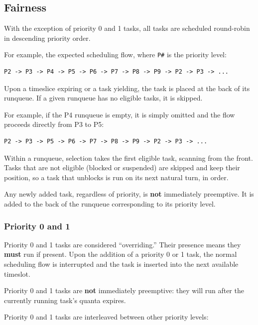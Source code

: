 \documentclass[11pt]{article}
\begin{document}
\subsection{Fairness}

With the exception of priority 0 and 1 tasks, all tasks are scheduled round-robin in descending priority order.

For example, the expected scheduling flow, where \texttt{P\#} is the priority level:

\begin{Verbatim}[fontsize=\small]
	P2 -> P3 -> P4 -> P5 -> P6 -> P7 -> P8 -> P9 -> P2 -> P3 -> ...
\end{Verbatim}

Upon a timeslice expiring or a task yielding, the task is placed at the back of its runqueue. If a given runqueue has no eligible tasks, it is skipped.

For example, if the P4 runqueue is empty, it is simply omitted and the flow proceeds directly from P3 to P5:

\begin{Verbatim}[fontsize=\small]
	P2 -> P3 -> P5 -> P6 -> P7 -> P8 -> P9 -> P2 -> P3 -> ...
\end{Verbatim}

Within a runqueue, selection takes the first eligible task, scanning from the front.
Tasks that are not eligible (blocked or suspended) are skipped and keep their position, so a task that unblocks is run on its next natural turn, in order.

Any newly added task, regardless of priority, is \textbf{not} immediately preemptive. It is added to the back of the runqueue corresponding to its priority level.

\subsubsection{Priority 0 and 1}

Priority 0 and 1 tasks are considered ``overriding.'' Their presence means they \textbf{must} run if present.
Upon the addition of a priority 0 or 1 task, the normal scheduling flow is interrupted and the task is inserted into the next available timeslot.

Priority 0 and 1 tasks are \textbf{not} immediately preemptive: they will run after the currently running task's quanta expires.

Priority 0 and 1 tasks are interleaved between other priority levels:
\end{document}

